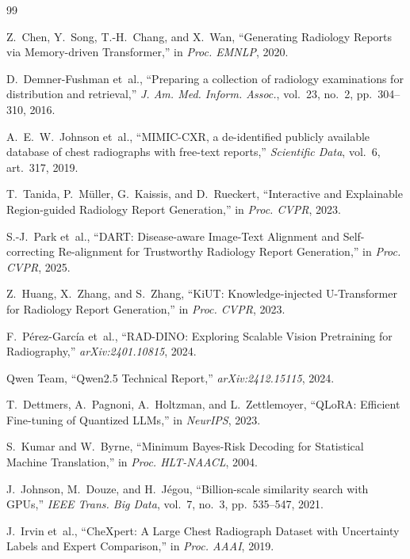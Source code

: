 \documentclass[12pt,a4paper]{report}
\begin{document}
\begin{thebibliography}{99}

Z.~Chen, Y.~Song, T.-H.~Chang, and X.~Wan, ``Generating Radiology Reports via Memory-driven Transformer,'' in \emph{Proc. EMNLP}, 2020.

D.~Demner-Fushman et~al., ``Preparing a collection of radiology examinations for distribution and retrieval,'' \emph{J. Am. Med. Inform. Assoc.}, vol.~23, no.~2, pp.~304--310, 2016.

A.~E.~W.~Johnson et~al., ``MIMIC-CXR, a de-identified publicly available database of chest radiographs with free-text reports,'' \emph{Scientific Data}, vol.~6, art.~317, 2019.

T.~Tanida, P.~M{\"u}ller, G.~Kaissis, and D.~Rueckert, ``Interactive and Explainable Region-guided Radiology Report Generation,'' in \emph{Proc. CVPR}, 2023.

S.-J.~Park et~al., ``DART: Disease-aware Image-Text Alignment and Self-correcting Re-alignment for Trustworthy Radiology Report Generation,'' in \emph{Proc. CVPR}, 2025.

Z.~Huang, X.~Zhang, and S.~Zhang, ``KiUT: Knowledge-injected U-Transformer for Radiology Report Generation,'' in \emph{Proc. CVPR}, 2023.

F.~P{\'e}rez-Garc{\'i}a et~al., ``RAD-DINO: Exploring Scalable Vision Pretraining for Radiography,'' \emph{arXiv:2401.10815}, 2024.

Qwen Team, ``Qwen2.5 Technical Report,'' \emph{arXiv:2412.15115}, 2024.

T.~Dettmers, A.~Pagnoni, A.~Holtzman, and L.~Zettlemoyer, ``QLoRA: Efficient Fine-tuning of Quantized LLMs,'' in \emph{NeurIPS}, 2023.

S.~Kumar and W.~Byrne, ``Minimum Bayes-Risk Decoding for Statistical Machine Translation,'' in \emph{Proc. HLT-NAACL}, 2004.

J.~Johnson, M.~Douze, and H.~J{\'e}gou, ``Billion-scale similarity search with GPUs,'' \emph{IEEE Trans. Big Data}, vol.~7, no.~3, pp.~535--547, 2021.

J.~Irvin et~al., ``CheXpert: A Large Chest Radiograph Dataset with Uncertainty Labels and Expert Comparison,'' in \emph{Proc. AAAI}, 2019.


\end{thebibliography}
\end{document}
